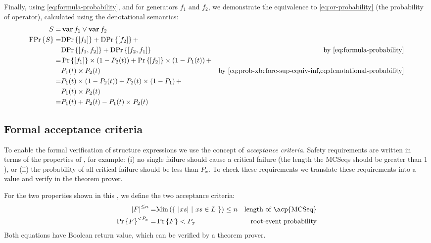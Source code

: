 \documentclass[12pt,openright,twoside,a4paper,oldfontcommands,english,brazil,final]{abntex2}
\theoremstyle{theo}
\def\varop{\ensuremath\operatorname{\mathbf{var}}}
\newcommand{\var}[1]{\ensuremath\varop #1}
\newcommand{\length}[1]{\ensuremath\left|#1\right|}
\def\probabilityop{\ensuremath \Pr}
\newcommand{\probability}[1]{\ensuremath \probabilityop\left\{#1\right\}}
\def\denotationalprobop{\ensuremath\mathrm{DPr}}
\newcommand{\denotationalprob}[1]{\ensuremath \denotationalprobop\left\{#1\right\}}
\def\formulaprobop{\ensuremath\mathrm{FPr}}
\newcommand{\formulaprob}[1]{\ensuremath \formulaprobop\left\{#1\right\}}
\def\Minop{\ensuremath\mathrm{Min}}
\newcommand{\Min}[1]{\ensuremath\Minop\left(#1\right)}
\newcommand{\lengthacceptance}[2]{\ensuremath\length{#1}^{\le#2}}
\newcommand{\probacceptance}[2]{\ensuremath\probability{#1}^{<#2}}
\newcommand{\vari}[1]{\ensuremath\var{f_{#1}}}
\begin{document}
Finally, using \cref{eq:formula-probability}, and for generators $f_1$ and $f_2$, we demonstrate the equivalence to \cref{eq:or-probability} (the probability of  operator), calculated using the denotational semantics:
%
\begin{align}
S = & \vari{1} \lor \vari{2}\nonumber\\
\formulaprob{S} = & \denotationalprob{\left[f_1\right]} +
  \denotationalprob{\left[f_2\right]} + \nonumber\\
  & \denotationalprob{\left[f_1,f_2\right]} +
  \denotationalprob{\left[f_2,f_1\right]}
  & \text{by \cref{eq:formula-probability}}
\nonumber\\
= &\probability{\left[f_1\right]}\times\left(1 - P_2(t)\right) + 
\probability{\left[f_2\right]}\times\left(1 - P_1(t)\right) +\nonumber\\
&P_1(t) \times P_2(t) & \text{by \cref{eq:prob-xbefore-sup-equiv-inf,eq:denotational-probability}}\nonumber\\
= & P_1(t) \times \left(1 - P_2(t)\right) + P_2(t) \times \left(1 - P_1\right) + \nonumber\\
  & P_1(t) \times P_2(t)\nonumber\\
= & P_1(t) + P_2(t) - P_1(t) \times P_2(t)
\end{align}

\subsection{Formal acceptance criteria}
\label{sec:formal-acceptance-criteria}

To enable the formal verification of structure expressions we use the concept of \emph{acceptance criteria}.
Safety requirements are written in terms of the properties of , for example: (i) no single failure should cause a critical failure (the length the \acp{MCSeq} should be greater than $1$), or (ii) the probability of all critical failure should be less than $P_x$.
To check these requirements we translate these requirements into a value and verify in the theorem prover.

For the two properties shown in this , we define the two acceptance criteria:
%
\begin{subequations}
\begin{align}
\lengthacceptance{F}{n} = & \Min{\left\{~ \length{xs} ~\middle|~ xs \in L ~\right\}} \le n & \text{length of \acp{MCSeq}}\\
\probacceptance{F}{P_x} = & \probability{F} < P_x & \text{root-event probability}
\end{align}
\end{subequations}
%
Both equations have Boolean return value, which can be verified by a theorem prover.
\end{document}
